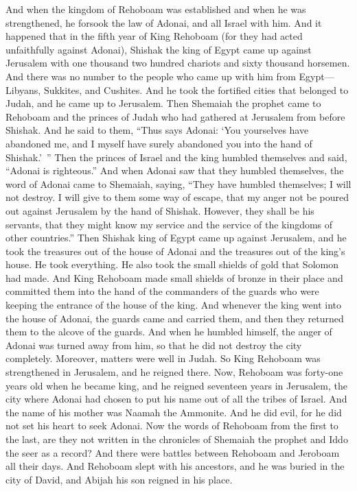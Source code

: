 \begin{biblechapter} %
 And when the kingdom of Rehoboam was established and when he was strengthened, he forsook the law of Adonai, and all Israel with him.
\verse And it happened that in the fifth year of King Rehoboam (for they had acted unfaithfully against Adonai), Shishak the king of Egypt came up against Jerusalem
\verse with one thousand two hundred chariots and sixty thousand horsemen. And there was no number to the people who came up with him from Egypt—Libyans, Sukkites, and Cushites.
\verse And he took the fortified cities that belonged to Judah, and he came up to Jerusalem.
\verse Then Shemaiah the prophet came to Rehoboam and the princes of Judah who had gathered at Jerusalem from before Shishak. And he said to them, “Thus says Adonai: ‘You yourselves have abandoned me, and I myself have surely abandoned you into the hand of Shishak.’ ”
\verse Then the princes of Israel and the king humbled themselves and said, “Adonai is righteous.”
\verse And when Adonai saw that they humbled themselves, the word of Adonai came to Shemaiah, saying, “They have humbled themselves; I will not destroy. I will give to them some way of escape, that my anger not be poured out against Jerusalem by the hand of Shishak.
\verse However, they shall be his servants, that they might know my service and the service of the kingdoms of other countries.”
\verse Then Shishak king of Egypt came up against Jerusalem, and he took the treasures out of the house of Adonai and the treasures out of the king’s house. He took everything. He also took the small shields of gold that Solomon had made.
\verse And King Rehoboam made small shields of bronze in their place and committed them into the hand of the commanders of the guards who were keeping the entrance of the house of the king.
\verse And whenever the king went into the house of Adonai, the guards came and carried them, and then they returned them to the alcove of the guards.
\verse And when he humbled himself, the anger of Adonai was turned away from him, so that he did not destroy the city completely. Moreover, matters were well in Judah.
 So King Rehoboam was strengthened in Jerusalem, and he reigned there. Now, Rehoboam was forty-one years old when he became king, and he reigned seventeen years in Jerusalem, the city where Adonai had chosen to put his name out of all the tribes of Israel. And the name of his mother was Naamah the Ammonite.
\verse And he did evil, for he did not set his heart to seek Adonai.
\verse Now the words of Rehoboam from the first to the last, are they not written in the chronicles of Shemaiah the prophet and Iddo the seer as a record? And there were battles between Rehoboam and Jeroboam all their days.
\verse And Rehoboam slept with his ancestors, and he was buried in the city of David, and Abijah his son reigned in his place.
\end{biblechapter}

